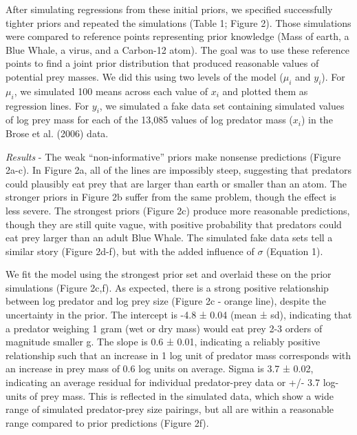 \documentclass[
  12pt,
]{article}
\begin{document}
After simulating regressions from these initial priors, we specified
successfully tighter priors and repeated the simulations (Table 1;
Figure 2). Those simulations were compared to reference points
representing prior knowledge (Mass of earth, a Blue Whale, a virus, and
a Carbon-12 atom). The goal was to use these reference points to find a
joint prior distribution that produced reasonable values of potential
prey masses. We did this using two levels of the model (\(\mu_i\) and
\(y_i\)). For \(\mu_i\), we simulated 100 means across each value of
\(x_i\) and plotted them as regression lines. For \(y_i\), we simulated
a fake data set containing simulated values of log prey mass for each of
the 13,085 values of log predator mass (\(x_i\)) in the Brose et al.
(2006) data.

\emph{Results} - The weak ``non-informative'' priors make nonsense
predictions (Figure 2a-c). In Figure 2a, all of the lines are impossibly
steep, suggesting that predators could plausibly eat prey that are
larger than earth or smaller than an atom. The stronger priors in Figure
2b suffer from the same problem, though the effect is less severe. The
strongest priors (Figure 2c) produce more reasonable predictions, though
they are still quite vague, with positive probability that predators
could eat prey larger than an adult Blue Whale. The simulated fake data
sets tell a similar story (Figure 2d-f), but with the added influence of
\(\sigma\) (Equation 1).

We fit the model using the strongest prior set and overlaid these on the
prior simulations (Figure 2c,f). As expected, there is a strong positive
relationship between log predator and log prey size (Figure 2c - orange
line), despite the uncertainty in the prior. The intercept is -4.8 ±
0.04 (mean ± sd), indicating that a predator weighing 1 gram (wet or dry
mass) would eat prey 2-3 orders of magnitude smaller g. The slope is 0.6
± 0.01, indicating a reliably positive relationship such that an
increase in 1 log unit of predator mass corresponds with an increase in
prey mass of 0.6 log units on average. Sigma is 3.7 ± 0.02, indicating
an average residual for individual predator-prey data or +/- 3.7
log-units of prey mass. This is reflected in the simulated data, which
show a wide range of simulated predator-prey size pairings, but all are
within a reasonable range compared to prior predictions (Figure 2f).
\end{document}
